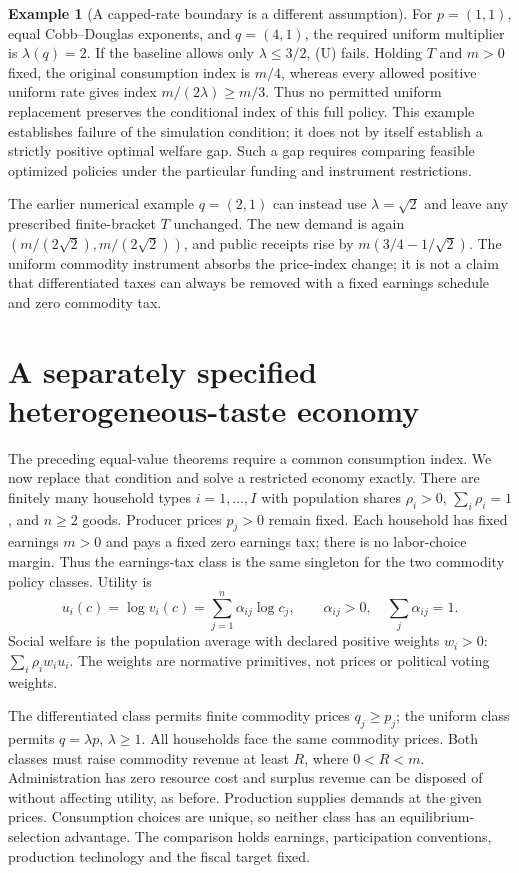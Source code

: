 \documentclass[11pt]{article}
\theoremstyle{definition}
\newtheorem{example}{Example}
\begin{document}
\begin{example}[A capped-rate boundary is a different assumption]
For $p=(1,1)$, equal Cobb--Douglas exponents, and $q=(4,1)$, the
required uniform multiplier is $\lambda(q)=2$. If the baseline allows
only $\lambda\leq3/2$, (U) fails. Holding $T$ and $m>0$ fixed, the
original consumption index is $m/4$, whereas every allowed positive
uniform rate gives index $m/(2\lambda)\geq m/3$. Thus no permitted
uniform replacement preserves the conditional index of this full
policy. This example establishes failure of the simulation condition;
it does not by itself establish a strictly positive optimal welfare
gap. Such a gap requires comparing feasible optimized policies under
the particular funding and instrument restrictions.
\end{example}

The earlier numerical example $q=(2,1)$ can instead use
$\lambda=\sqrt2$ and leave any prescribed finite-bracket $T$ unchanged.
The new demand is again $(m/(2\sqrt2),m/(2\sqrt2))$, and public receipts
rise by $m(3/4-1/\sqrt2)$. The uniform commodity instrument absorbs the
price-index change; it is not a claim that differentiated taxes can
always be removed with a fixed earnings schedule and zero commodity tax.


\section*{A separately specified heterogeneous-taste economy}
The preceding equal-value theorems require a common consumption index.
We now replace that condition and solve a restricted economy exactly.
There are finitely many household types $i=1,\ldots,I$ with population
shares $\rho_i>0$, $\sum_i\rho_i=1$, and $n\geq2$ goods. Producer
prices $p_j>0$ remain fixed. Each household has fixed earnings $m>0$
and pays a fixed zero earnings tax; there is no labor-choice margin.
Thus the earnings-tax class is the same singleton for the two commodity
policy classes. Utility is
\[
 u_i(c)=\log v_i(c)=\sum_{j=1}^n\alpha_{ij}\log c_j,
 \qquad \alpha_{ij}>0,\quad \sum_j\alpha_{ij}=1.
\]
Social welfare is the population average with declared positive weights
$w_i>0$: $\sum_i\rho_iw_i u_i$. The weights are normative primitives,
not prices or political voting weights.

The differentiated class permits finite commodity prices $q_j\geq p_j$;
the uniform class permits $q=\lambda p$, $\lambda\geq1$. All households
face the same commodity prices. Both classes must raise commodity
revenue at least $R$, where $0<R<m$. Administration has zero resource
cost and surplus revenue can be disposed of without affecting utility,
as before. Production supplies demands at the given prices. Consumption
choices are unique, so neither class has an equilibrium-selection
advantage. The comparison holds earnings, participation conventions,
production technology and the fiscal target fixed.
\end{document}
